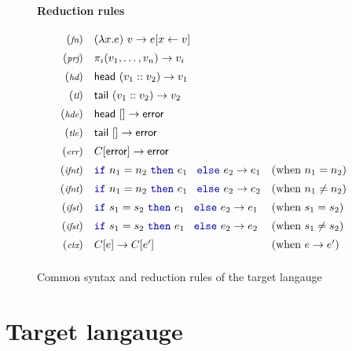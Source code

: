 \documentclass[
		twoside,openright,titlepage,numbers=noenddot,headinclude,%
                footinclude=true,cleardoublepage=empty,
                BCOR=10mm,paper=a4,fontsize=10pt, %
                ngerman,american, %
                ]{scrreprt}
\newcommand{\kvd}[1]{\textnormal{\textcolor{kvdclr}{\ttfamily #1}}}
\newcommand{\ident}[1]{\textnormal{\sffamily #1}}
\begin{document}
\begin{figure}[t]
\paragraph{Reduction rules}
\begin{equation*}
\begin{array}{rll}
  \footnotesize{(\emph{fn})}  & (\lambda x.e)~v \rightarrow e[x\leftarrow v] \\[0.5em]
  \footnotesize{(\emph{prj})} & \pi_i (v_1, \ldots, v_n) \rightarrow v_i\\[0.5em]
  \footnotesize{(\emph{hd})}  & \ident{head}~(v_1::v_2) \rightarrow v_1\\[0.5em]
  \footnotesize{(\emph{tl})}  & \ident{tail}~(v_1::v_2) \rightarrow v_2\\[0.5em]
  \footnotesize{(\emph{hde})}  & \ident{head}~[] \rightarrow \ident{error}\\[0.5em]
  \footnotesize{(\emph{tle})}  & \ident{tail}~[] \rightarrow \ident{error}\\[0.5em]
  \footnotesize{(\emph{err})}  & C[\ident{error}] \rightarrow \ident{error}\\[0.5em]
  \footnotesize{(\emph{ifnt})}  & \kvd{if}~n_1 = n_2~\kvd{then}~e_1~\kvd{else}~e_2 \rightarrow e_1 & (\textnormal{when}~n_1 = n_2)\\[0.5em]
  \footnotesize{(\emph{ifnt})}  & \kvd{if}~n_1 = n_2~\kvd{then}~e_1~\kvd{else}~e_2 \rightarrow e_2 & (\textnormal{when}~n_1 \neq n_2)\\[0.5em]
  \footnotesize{(\emph{ifst})}  & \kvd{if}~s_1 = s_2~\kvd{then}~e_1~\kvd{else}~e_2 \rightarrow e_1 & (\textnormal{when}~s_1 = s_2)\\[0.5em]
  \footnotesize{(\emph{ifst})}  & \kvd{if}~s_1 = s_2~\kvd{then}~e_1~\kvd{else}~e_2 \rightarrow e_2 & (\textnormal{when}~s_1 \neq s_2)\\[0.5em]
  \footnotesize{(\emph{ctx})}  & C[e] \rightarrow C[e']  & (\textnormal{when}~e\rightarrow e')\\[0.5em]
\end{array}
\end{equation*}

\caption{Common syntax and reduction rules of the target langauge}
\label{fig:transl-target}
\end{figure}


\section{Target langauge}
\end{document}
